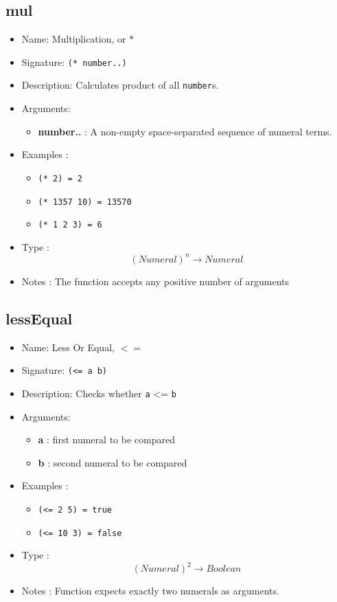\subsection{mul}
\begin{itemize}
    \item Name: Multiplication, or $*$
    \item Signature: \texttt{(* number..)}
    \item Description: Calculates product of all \texttt{number}s.
    \item Arguments:
        \begin{itemize}
            \item \textbf{number..} : A non-empty space-separated sequence of numeral terms.
        \end{itemize}
    \item Examples :
        \begin{itemize}
            \item \texttt{(* 2) = 2}
            \item \texttt{(* 1357 10) = 13570}
            \item \texttt{(* 1 2 3) = 6}
        \end{itemize}
    \item Type : \[(Numeral)^n \to Numeral\]
    \item Notes : The function accepts any positive number of arguments
\end{itemize}

\subsection{lessEqual}
\begin{itemize}
    \item Name: Less Or Equal, $<=$
    \item Signature: \texttt{(<= a b)}
    \item Description: Checks whether \texttt{a} <= \texttt{b}
    \item Arguments:
        \begin{itemize}
            \item \textbf{a} : first numeral to be compared
            \item \textbf{b} : second numeral to be compared
        \end{itemize}
    \item Examples :
        \begin{itemize}
            \item \texttt{(<= 2 5) = true}
            \item \texttt{(<= 10 3) = false}
        \end{itemize}
    \item Type : \[(Numeral)^2 \to Boolean\]
    \item Notes : Function expects exactly two numerals as arguments.
\end{itemize}

